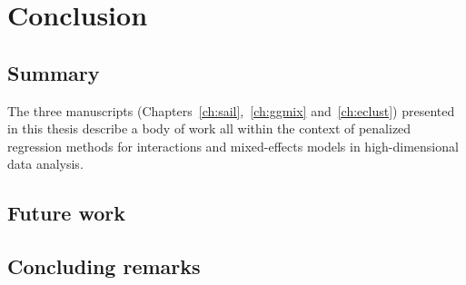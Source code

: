 \chapter{Conclusion\label{ch:conclusion}}

\section{Summary}
The three manuscripts (Chapters~\ref{ch:sail},~\ref{ch:ggmix} and~\ref{ch:eclust}) presented in this thesis describe a body of work all within the context of penalized regression methods for interactions and mixed-effects models in high-dimensional data analysis. 


\section{Future work}



\section{Concluding remarks}